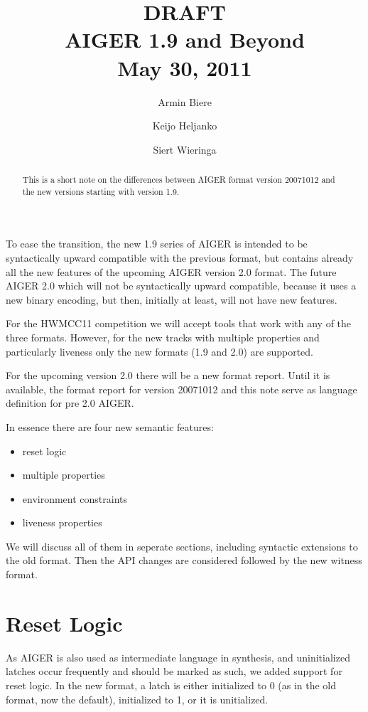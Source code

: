 \documentclass{llncs}
\title{
{\color{blue}\large DRAFT}\\
  AIGER 1.9 and Beyond \\
{\color{blue}\large May 30, 2011}}
\author{Armin Biere\inst{1} \and
Keijo Heljanko\inst{2} \and
Siert Wieringa\inst{2}}
\institute{Johannes Kepler University, Austria \and Alto University, Finland}
\begin{document}
\maketitle
\begin{abstract}
This is a short note on the differences between AIGER format version 20071012
and the new versions starting with version 1.9.
\end{abstract}
To ease the transition, the new 1.9 series of AIGER is intended to be
syntactically upward compatible with the previous format, but contains
already all the new features of the upcoming AIGER version 2.0 format.  The
future AIGER 2.0 which will not be syntactically upward compatible, because
it uses a new binary encoding, but then, initially at least, will not have
new features.

For the HWMCC11 competition we will accept tools that work with any of
the three formats.  However, for the new tracks with multiple properties and 
particularly liveness only the new formats (1.9 and 2.0) are supported.

For the upcoming version 2.0 there will be a new format report. Until it is
available, the format report for version 20071012 and this note serve as
language definition for pre 2.0 AIGER.  

In essence there are four new semantic features:

\begin{itemize}
\item reset logic
\item multiple properties
\item environment constraints
\item liveness properties
\end{itemize}

We will discuss all of them in seperate sections, including syntactic
extensions to the old format.   Then the API changes are considered followed
by the new witness format.

\section{Reset Logic}

As AIGER is also used as intermediate language in synthesis, and
uninitialized latches occur frequently and should be marked as such, we
added support for reset logic.  In the new format, a latch is either
initialized to 0 (as in the old format, now the default), initialized to 1,
or it is unitialized.
\end{document}
